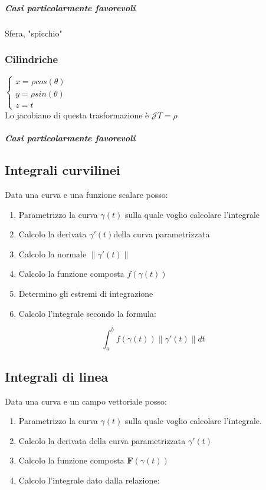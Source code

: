 \documentclass[10pt,a4paper]{report}
\newcommand{\norm}[1]{ \left\lVert {#1} \right\rVert}
\begin{document}
				\subparagraph{Casi particolarmente favorevoli}
                Sfera, "spicchio"
                
			\subsubsection{Cilindriche}
			$ \begin{cases} 
			x=\rho cos(\theta) \\ 
			y=\rho sin(\theta) \\
			z=t
			\end{cases} $
			\\
			Lo jacobiano di questa trasformazione è $\mathcal{J}T=\rho $
			
				\subparagraph{Casi particolarmente favorevoli}
		

		\subsection*{Integrali \textbf{curvilinei}}
			Data una curva e una funzione scalare posso:
			\begin{enumerate}
				\item Parametrizzo la curva $ \gamma(t) $ sulla quale voglio calcolare l'integrale
				\item Calcolo la derivata $ \gamma ' (t) $della curva parametrizzata
                \item Calcolo la normale $ \norm{\gamma '(t)} $
				\item Calcolo la funzione composta $ f(\gamma (t)) $
				\item Determino gli estremi di integrazione
				\item Calcolo l'integrale secondo la formula:
			\end{enumerate}
		
		\[ \int_{a}^{b} f(\gamma (t)) \norm{\gamma '(t)} dt\]
		
		
		\subsection*{Integrali di \textbf{linea}}
		Data una curva e un campo vettoriale posso:
			\begin{enumerate}
				\item Parametrizzo la curva $ \gamma(t) $ sulla quale voglio calcolare l'integrale. 
				\item Calcolo la derivata della curva parametrizzata $ \gamma ' (t) $ 
				\item Calcolo la funzione composta $ \mathbf{F}(\gamma (t)) $
				\item Calcolo l'integrale dato dalla relazione:
				\end{enumerate}
			
\end{document}
